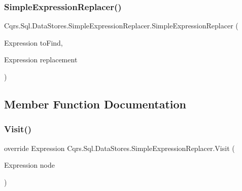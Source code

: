 \subsubsection{\texorpdfstring{Simple\+Expression\+Replacer()}{SimpleExpressionReplacer()}}
{\footnotesize\ttfamily Cqrs.\+Sql.\+Data\+Stores.\+Simple\+Expression\+Replacer.\+Simple\+Expression\+Replacer (\begin{DoxyParamCaption}\item[{Expression}]{to\+Find,  }\item[{Expression}]{replacement }\end{DoxyParamCaption})}



\subsection{Member Function Documentation}
\mbox{\label{classCqrs_1_1Sql_1_1DataStores_1_1SimpleExpressionReplacer_a362c833782ea518d3b10f74898136241_a362c833782ea518d3b10f74898136241}} 
\subsubsection{\texorpdfstring{Visit()}{Visit()}}
{\footnotesize\ttfamily override Expression Cqrs.\+Sql.\+Data\+Stores.\+Simple\+Expression\+Replacer.\+Visit (\begin{DoxyParamCaption}\item[{Expression}]{node }\end{DoxyParamCaption})}

